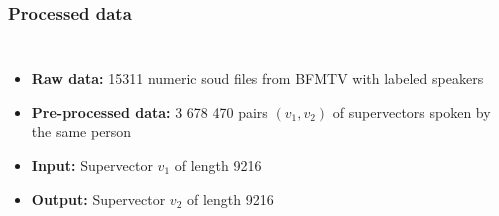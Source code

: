 \documentclass[11pt,english]{beamer}
\begin{document}
\begin{frame}
  \frametitle{Processed data}

  \begin{columns}
    \begin{itemize}
\setlength\itemsep{2em}
    \item \textbf{Raw data:} 15311 numeric soud files from BFMTV with labeled speakers
    \item \textbf{Pre-processed data:} 3 678 470 pairs $(v_1,v_2)$ of supervectors
      spoken by the same person
    \item \textbf{Input:} Supervector $v_1$ of length 9216
    \item \textbf{Output:} Supervector $v_2$ of length 9216

    \end{itemize}


\end{columns}
\end{frame}
\end{document}
